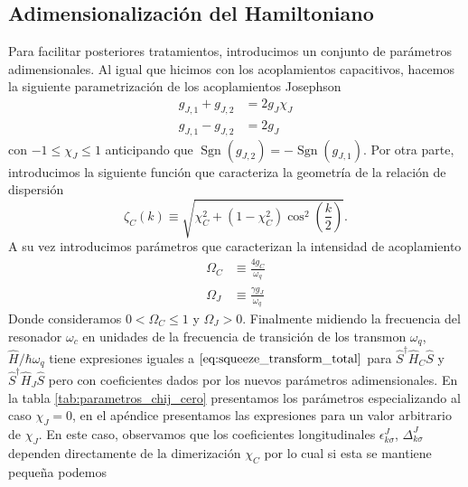 \subsection{Adimensionalización del Hamiltoniano}
Para facilitar posteriores tratamientos, introducimos un conjunto de parámetros adimensionales. Al igual que hicimos con los acoplamientos capacitivos, hacemos la siguiente parametrización de los acoplamientos Josephson
\begin{subequations}
    \begin{align}
        g_{J,1} + g_{J,2} &= 2g_J \chi_J\\
        g_{J,1} - g_{J,2} &= 2g_J 
    \end{align}\label{eq:josephson_parametrization}
\end{subequations}
con $-1 \leq \chi_J \leq 1$ anticipando que $\operatorname{Sgn}(g_{J,2}) = - \operatorname{Sgn}(g_{J,1})$. Por otra parte, introducimos la siguiente función que caracteriza la geometría de la relación de dispersión
\begin{equation}
    \zeta_C(k) \equiv \sqrt{\chi_C^2 + (1-\chi_C^2) \cos^2(\frac{k}{2})}. 
\end{equation}
A su vez introducimos parámetros que caracterizan la intensidad de acoplamiento 
\begin{subequations}
    \begin{align}
        \Omega_C &\equiv \frac{4g_C}{\omega_q}\\
        \Omega_J &\equiv \frac{\gamma g_J}{\omega_q}
    \end{align}
\end{subequations}
Donde consideramos $0 < \Omega_C \leq 1$ y $\Omega_J > 0$. Finalmente midiendo la frecuencia del resonador $\omega_c$ en unidades de la frecuencia de transición de los transmon $\omega_q$, $\hat H / \hbar \omega_q$ tiene expresiones iguales a $\eqref{eq:squeeze_transform_total}$ para $\hat S^\dag \hat H_C \hat S$ y $\hat S^\dag \hat H_J \hat S$ pero con coeficientes dados por los nuevos parámetros adimensionales. En la tabla \ref{tab:parametros_chij_cero} presentamos los parámetros especializando al caso $\chi_J = 0$, en el apéndice presentamos las expresiones para un valor arbitrario de $\chi_J$. En este caso, observamos que los coeficientes longitudinales $\epsilon_{k\sigma}^J$, $\Delta_{k\sigma}^J$ dependen directamente de la dimerización $\chi_C$ por lo cual si esta se mantiene pequeña podemos 
